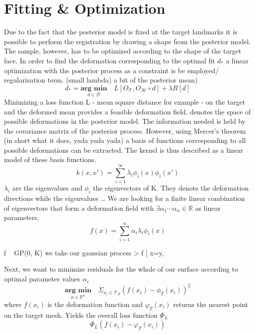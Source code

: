 \section{Fitting \& Optimization}
\label{optimization}

Due to the fact that the posterior model is fixed at the target landmarks it is possible to perform the registration by drawing a shape from the posterior model. The sample, however, has to be optimized according to the shape of the target face. 
In order to find the deformation corresponding to the optimal fit $d_{*}$ a linear optimization with the posterior process as a constraint is be employed/ regularization term. (small lambda) a bit of the posterior mean) 
\begin{equation}
d_{*} = \underset{d \in \mathcal{D}}{\textbf{arg min}}\quad L[O_{\mathcal{T}}, O_{\mathcal{M}} \circ d]+\lambda R[d]
\end{equation}
Minimizing a loss function L - mean square distance for example - on the target and the deformed mean provides a feasible deformation field. 
 denotes the space of possible deformations in the posterior model. The information needed is held by the covariance matrix of the posterior process. However, using Mercer's theorem (in short what it does, yada yada yada) a basis of functions corresponding to all possible deformations can be extracted. The kernel is thus described as a linear model of these basis functions.    
\begin{equation}
k(x,x') = \sum^{\infty}_{i=1}\lambda_{i}\phi_{i}(x)\phi_{i}(x')
\end{equation}
$\lambda_{i}$ are the eigenvalues and $\phi_{i}$ the eigenvectors of K. They denote the deformation directions while the eigenvalues \ldots
We are looking for a finite linear combination of eigenvectors that form a deformation field with $\exists \alpha_{1} \cdots \alpha_{n} \in \mathbb{R}$ as linear parameters.
\begin{equation}
f(x) = \sum^{n}_{i=1} \alpha_{i}\lambda_{i}\phi_{i}(x)
\end{equation}

f ~ GP(0, K) we take our gaussian process
> f | x=y, 

Next, we want to minimize residuals for the whole of our surface according to optimal parameter values $\alpha_{i}$ 
\begin{equation}
    \underset{\alpha \in \mathbb{R}^n}{\textbf{arg min}}\quad \Sigma_{x_{i} \in \mathcal{T}_{R}} (f(x_{i}) - \phi_{T}(x_{i}))^2
\end{equation}
where $f(x_{i})$ is the deformation function and $\varphi_{T}(x_{i})$ returns the nearest point on the target mesh. Yields the overall loss function $\Phi_{L}$ 
\begin{equation}
\Phi_{L}(f(x_{i})-\varphi_{T}(x_{i}))
\end{equation}


